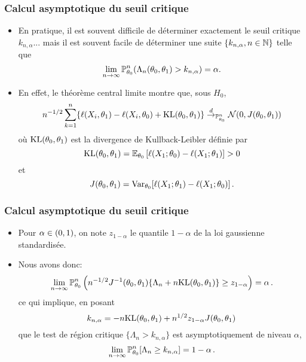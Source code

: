 \begin{frame}
\frametitle{Calcul asymptotique du seuil critique}
\begin{itemize}
\item En pratique, il est souvent difficile de déterminer exactement le seuil critique $k_{n,\alpha}$... mais il est souvent facile de déterminer
une suite $\{k_{n,\alpha}, n \in \mathbb{N}\}$ telle que
\[
\lim_{n \to \infty} \operatorname{{\mathbb P}}^n_{\theta_0} ( \Lambda_n(\theta_0,\theta_1) > k_{n,\alpha}) = \alpha.
\]
\item En effet, le théorème central limite montre que, sous $H_0$,
\[
n^{-1/2} \sum_{k=1}^n \{ \ell(X_i,\theta_1) - \ell(X_i,\theta_0) + \mathrm{KL}(\theta_0,\theta_1) \} \stackrel{d}{\rightarrow}_{\operatorname{{\mathbb P}}^n_{\theta_0}} \mathcal{N}(0,J(\theta_0,\theta_1))
\]
où $\mathrm{KL}(\theta_0,\theta_1)$ est la \alert{divergence de Kullback-Leibler} définie par
\[
\mathrm{KL}(\theta_0,\theta_1) = \operatorname{{\mathbb E}}_{\theta_0}\left[ \ell(X_1;\theta_0) - \ell(X_1;\theta_1) \right] > 0
\]
et
\[
J(\theta_0,\theta_1)= \operatorname{\mathrm{Var}}_{\theta_0}[ \ell(X_1;\theta_1) - \ell(X_1;\theta_0) ] \,.
\]
\end{itemize}
\end{frame}

\begin{frame}
\frametitle{Calcul asymptotique du seuil critique}
\begin{itemize}
\item Pour $\alpha \in \left(0,1\right)$, on note $z_{1-\alpha}$ le quantile $1-\alpha$ de la loi gaussienne standardisée.
\item  Nous avons donc:
\[
\lim_{n \to \infty} \operatorname{{\mathbb P}}_{\theta_0}^n \left( n^{-1/2} J^{-1}(\theta_0,\theta_1) \{ \Lambda_n + n \mathrm{KL}(\theta_0,\theta_1) \} \geq z_{1-\alpha} \right) = \alpha \,.
\]
ce qui implique, en posant
\[
k_{n,\alpha}= -n \mathrm{KL}(\theta_0,\theta_1) + n^{1/2} z_{1-\alpha} J(\theta_0,\theta_1)
\]
que le test de région critique $\{ \Lambda_n > k_{n,\alpha} \}$ est asymptotiquement de niveau $\alpha$,
\[
\lim_{n \to \infty} \operatorname{{\mathbb P}}^n_{\theta_0} [ \Lambda_n \geq k_{n,\alpha} ]  = 1 - \alpha \,.
\]
\end{itemize}
\end{frame}

